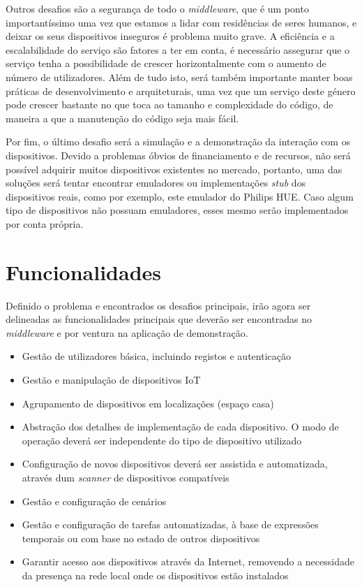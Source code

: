 Outros desafios são a segurança de todo o \textit{middleware}, que é um ponto importantíssimo uma vez que estamos a lidar com residências de seres humanos, e deixar os seus dispositivos inseguros é problema muito grave. A eficiência e a escalabilidade do serviço são fatores a ter em conta, é necessário assegurar que o serviço tenha a possibilidade de crescer horizontalmente com o aumento de número de utilizadores. Além de tudo isto, será também importante manter boas práticas de desenvolvimento e arquiteturais, uma vez que um serviço deste género pode crescer bastante no que toca ao tamanho e complexidade do código, de maneira a que a manutenção do código seja mais fácil.

Por fim, o último desafio será a simulação e a demonstração da interação com os dispositivos. Devido a problemas óbvios de financiamento e de recursos, não será possível adquirir muitos dispositivos existentes no mercado, portanto, uma das soluções será tentar encontrar emuladores ou implementações \textit{stub} dos dispositivos reais, como por exemplo, este \cite{hueemulator} emulador do Philips HUE. Caso algum tipo de dispositivos não possuam emuladores, esses mesmo serão implementados por conta própria. 

\section{Funcionalidades}
\label{sec:funcionalidades}

Definido o problema e encontrados os desafios principais, irão agora ser delineadas as funcionalidades principais que deverão ser encontradas no \textit{middleware} e por ventura na aplicação de demonstração.

\begin{itemize}
    \item Gestão de utilizadores básica, incluindo registos e autenticação
    \item Gestão e manipulação de dispositivos IoT
    \item Agrupamento de dispositivos em localizações (espaço casa)
    \item Abstração dos detalhes de implementação de cada dispositivo. O modo de operação deverá ser independente do tipo de dispositivo utilizado
    \item Configuração de novos dispositivos deverá ser assistida e automatizada, através dum \textit{scanner} de dispositivos compatíveis
    \item Gestão e configuração de cenários
    \item Gestão e configuração de tarefas automatizadas, à base de expressões temporais ou com base no estado de outros dispositivos
    \item Garantir acesso aos dispositivos através da Internet, removendo a necessidade da presença na rede local onde os dispositivos estão instalados
\end{itemize}
